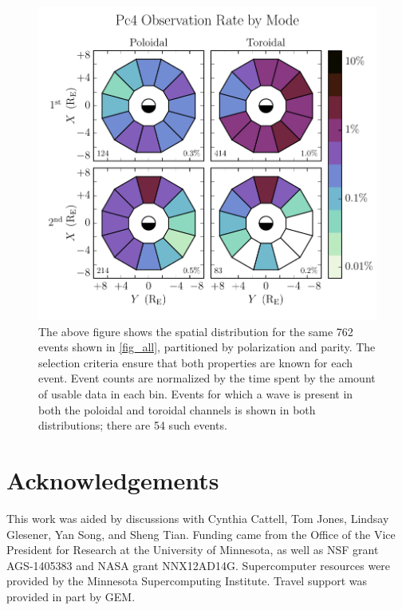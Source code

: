 \documentclass{article}
\begin{document}
\begin{figure}
    \begin{center}
    \includegraphics[width=\textwidth]{figures/fig_mode.pdf}
    \caption{
        The above figure shows the spatial distribution for the same 762 events shown in \cref{fig_all}, partitioned by polarization and parity. The selection criteria ensure that both properties are known for each event. Event counts are normalized by the time spent by the amount of usable data in each bin. Events for which a wave is present in both the poloidal and toroidal channels is shown in both distributions; there are 54 such events.
    }
    \label{fig_mode}
    \end{center}
\end{figure}


\section{Acknowledgements}

This work was aided by discussions with Cynthia Cattell, Tom Jones, Lindsay Glesener, Yan Song, and Sheng Tian. Funding came from the Office of the Vice President for Research at the University of Minnesota, as well as NSF grant AGS-1405383 and NASA grant NNX12AD14G. Supercomputer resources were provided by the Minnesota Supercomputing Institute. Travel support was provided in part by GEM.
\end{document}
